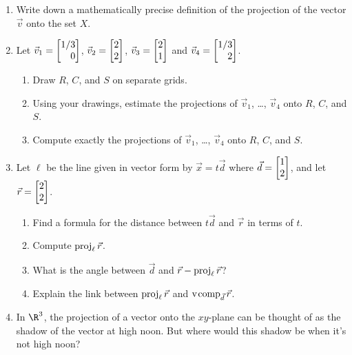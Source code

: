 \begin{enumerate}
	\item Write down a mathematically precise definition of the projection of the vector $\vec v$ onto the set $X$.
	\item Let $\vec v_1=\mat{1/3\\0}$, $\vec v_2=\mat{2\\2}$, $\vec v_3=\mat{2\\1}$ and $\vec v_4=\mat{1/3\\2}$.
	\begin{enumerate}
		\item Draw $R$, $C$, and $S$ on separate grids.
		\item Using your drawings, estimate the projections of $\vec v_1$, \ldots, $\vec v_4$ onto $R$, $C$, and $S$.
		\item Compute exactly the projections of $\vec v_1$, \ldots, $\vec v_4$ onto $R$, $C$, and $S$.
	\end{enumerate}


	\item Let $\ell$ be the line given in vector form by $\vec x=t\vec d$ where $\vec d=\mat{1\\2}$, and let $\vec r=\mat{2\\2}$.
		\begin{enumerate}
			\item Find a formula for the distance between $t\vec d$ and $\vec r$ in terms of $t$.
			\item Compute $\operatorname{proj}_\ell \vec r$.
			\item What is the angle between $\vec d$ and $\vec r-\operatorname{proj}_\ell \vec r$?
			\item Explain the link between $\operatorname{proj}_\ell \vec r$ and $\operatorname{\operatorname{v\hspace{1pt}comp}}_{\vec d}\vec r$.
		\end{enumerate}

	\item In $\R^3$, the projection of a vector onto the $xy$-plane can be thought of as the shadow
		of the vector at high noon. But where would this shadow be when it's not high noon?\


\end{enumerate}
